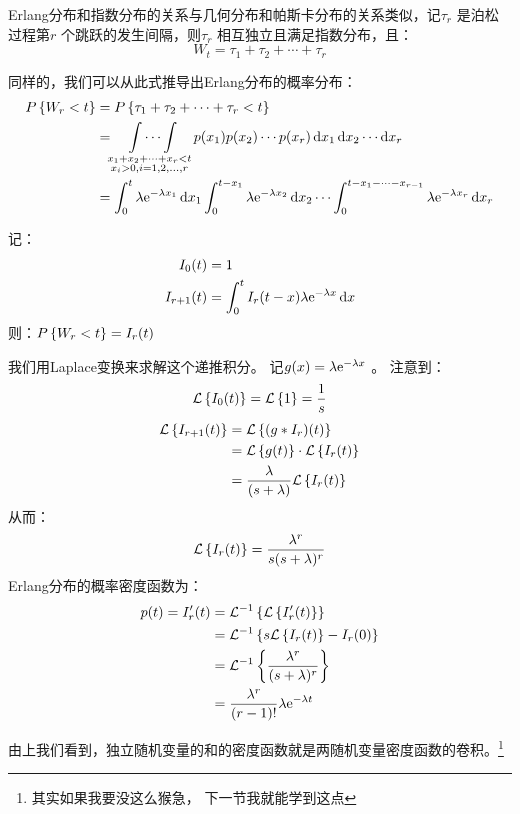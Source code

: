 Erlang分布和指数分布的关系与几何分布和帕斯卡分布的关系类似，记\(\tau_{r}\) 是泊松过程第\(r\)
个跳跃的发生间隔，则\(\tau_{r}\) 相互独立且满足指数分布，且：
\[
    W_{t} = \tau_{1} + \tau_{2} + \cdots + \tau_{r}
\]

同样的，我们可以从此式推导出Erlang分布的概率分布：
\begin{align*}
    \P{W_{r}<t} &= \P{\tau_{1}+\tau_{2}+\cdots+\tau_{r}<t} \\
    &= \idotsint\limits_{\substack{x_{1}+x_{2}+\dots +x_{r}<t
    \\ x_{i}>0, i=1,2,\ldots,r}} p(x_{1}) p(x_{2}) \cdots p(x_{r})
    \d{x}_{1} \d{x}_{2} \cdots \d{x}_{r} \\
    &=\int_{0}^{t} \lambda \e^{-\lambda x_{1}} \d{x_{1}}
    \int_{0}^{t-x_{1}} \lambda \e^{-\lambda x_{2}} \d{x_{2}} \cdots
    \int_{0}^{t-x_{1}-\cdots-x_{r-1}} \lambda \e^{-\lambda
    x_{r}} \d{x_{r}} \\
\end{align*}

记：
\begin{align*}
    I_{0}(t) &= 1\\
    I_{r+1}(t) &= \int_{0}^{t} I_{r}(t-x) \lambda
    \e^{-\lambda x} \d{x}
\end{align*}
则：\(\P{W_{r}<t} = I_{r}(t)\)

我们用Laplace变换来求解这个递推积分。
记\(g(x) = \lambda \e^{-\lambda x} \) 。
注意到：
\[
    \L{I_{0}(t)} = \L{1} = \frac{1}{s} \\
\]
\begin{align*}
    \L{I_{r+1}(t)} &= \L{(g * I_{r})(t)} \\
    &= \L{g(t)} \cdot \L{I_{r}(t)} \\
    &= \frac{\lambda}{(s+\lambda)} \L{I_{r}(t)}\\
\end{align*}
从而：\[
    \L{I_{r}(t)} = \frac{\lambda^{r}}{s(s+\lambda)^{r}} \\
\]
Erlang分布的概率密度函数为：
\begin{align*}
    p(t) = I_{r}'(t) &= \invL{\L{I_{r}'(t)}} \\
    &= \invL{s\L{I_{r}(t)} - I_{r}(0)} \\
    &= \invL{\frac{\lambda^{r}}{(s+\lambda)^{r}}} \\
    &= \frac{\lambda^{r}}{(r-1)!} \lambda \e^{-\lambda t} \\
\end{align*}

由上我们看到，独立随机变量的和的密度函数就是两随机变量密度函数的卷积。\footnote{其实如果我要没这么猴急，
下一节我就能学到这点}

